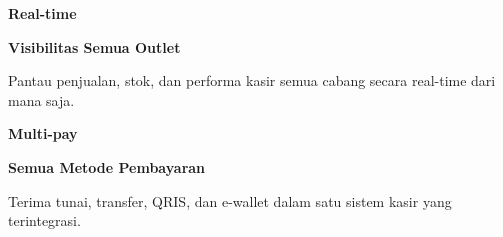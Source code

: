 \documentclass[a4paper]{article}
\begin{document}
\begin{minipage}[t]{0.485\textwidth}
    \noindent\colorbox{BlueBg}{%
        \begin{minipage}[t][2.7cm][c]{\dimexpr\linewidth-2\fboxsep\relax}
            \centering
            {\fontsize{20}{24}\selectfont\bfseries\color{AmberPrimary} Real-time}\par\vspace{2pt}
            {\fontsize{9.5}{12}\selectfont\bfseries\color{BlueDark} Visibilitas Semua Outlet}\par\vspace{2pt}
            {\fontsize{8.5}{11}\selectfont\color{TextDark}Pantau penjualan, stok, dan performa kasir semua cabang secara real-time dari mana saja.}
        \end{minipage}}\par
    \vspace{6pt}
    \noindent\colorbox{BlueBg}{%
        \begin{minipage}[t][2.7cm][c]{\dimexpr\linewidth-2\fboxsep\relax}
            \centering
            {\fontsize{20}{24}\selectfont\bfseries\color{AmberPrimary} Multi-pay}\par\vspace{2pt}
            {\fontsize{9.5}{12}\selectfont\bfseries\color{BlueDark} Semua Metode Pembayaran}\par\vspace{2pt}
            {\fontsize{8.5}{11}\selectfont\color{TextDark}Terima tunai, transfer, QRIS, dan e-wallet dalam satu sistem kasir yang terintegrasi.}
        \end{minipage}}%
\end{minipage}

\vspace{8pt}
\end{document}
